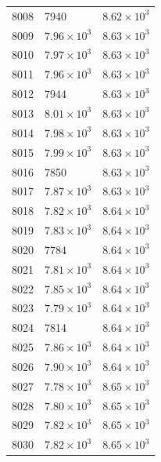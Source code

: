 \begin{table}[H]
\begin{tabular}{lll}
8008 & 7940 & $\displaystyle 8.62 \times 10^{3}$ \\
8009 & $\displaystyle 7.96 \times 10^{3}$ & $\displaystyle 8.63 \times 10^{3}$ \\
8010 & $\displaystyle 7.97 \times 10^{3}$ & $\displaystyle 8.63 \times 10^{3}$ \\
8011 & $\displaystyle 7.96 \times 10^{3}$ & $\displaystyle 8.63 \times 10^{3}$ \\
8012 & 7944 & $\displaystyle 8.63 \times 10^{3}$ \\
8013 & $\displaystyle 8.01 \times 10^{3}$ & $\displaystyle 8.63 \times 10^{3}$ \\
8014 & $\displaystyle 7.98 \times 10^{3}$ & $\displaystyle 8.63 \times 10^{3}$ \\
8015 & $\displaystyle 7.99 \times 10^{3}$ & $\displaystyle 8.63 \times 10^{3}$ \\
8016 & 7850 & $\displaystyle 8.63 \times 10^{3}$ \\
8017 & $\displaystyle 7.87 \times 10^{3}$ & $\displaystyle 8.63 \times 10^{3}$ \\
8018 & $\displaystyle 7.82 \times 10^{3}$ & $\displaystyle 8.64 \times 10^{3}$ \\
8019 & $\displaystyle 7.83 \times 10^{3}$ & $\displaystyle 8.64 \times 10^{3}$ \\
8020 & 7784 & $\displaystyle 8.64 \times 10^{3}$ \\
8021 & $\displaystyle 7.81 \times 10^{3}$ & $\displaystyle 8.64 \times 10^{3}$ \\
8022 & $\displaystyle 7.85 \times 10^{3}$ & $\displaystyle 8.64 \times 10^{3}$ \\
8023 & $\displaystyle 7.79 \times 10^{3}$ & $\displaystyle 8.64 \times 10^{3}$ \\
8024 & 7814 & $\displaystyle 8.64 \times 10^{3}$ \\
8025 & $\displaystyle 7.86 \times 10^{3}$ & $\displaystyle 8.64 \times 10^{3}$ \\
8026 & $\displaystyle 7.90 \times 10^{3}$ & $\displaystyle 8.64 \times 10^{3}$ \\
8027 & $\displaystyle 7.78 \times 10^{3}$ & $\displaystyle 8.65 \times 10^{3}$ \\
8028 & $\displaystyle 7.80 \times 10^{3}$ & $\displaystyle 8.65 \times 10^{3}$ \\
8029 & $\displaystyle 7.82 \times 10^{3}$ & $\displaystyle 8.65 \times 10^{3}$ \\
8030 & $\displaystyle 7.82 \times 10^{3}$ & $\displaystyle 8.65 \times 10^{3}$ \\

\end{tabular}
\end{table}

